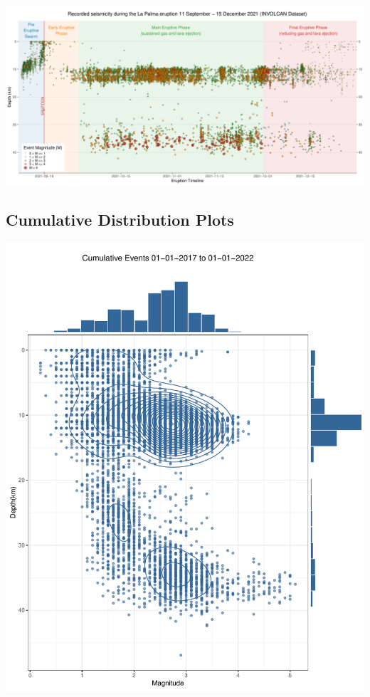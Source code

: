\documentclass[
]{agujournal2019}
\begin{document}
\includegraphics{index_files/figure-pdf/plot-timeline-1.pdf}

\hypertarget{cumulative-distribution-plots}{%
\subsection{Cumulative Distribution
Plots}\label{cumulative-distribution-plots}}

\includegraphics{index_files/figure-pdf/plot-dists-1.pdf}
\end{document}
